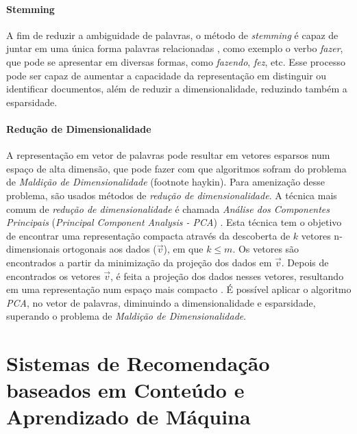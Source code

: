 \documentclass[normaltoc, espacoumemeio, pnumromarab,ruledheader]{abnt}
\begin{document}

    \subsubsection{Stemming}

    A fim de reduzir a ambiguidade de palavras, o método de \textit{stemming} é capaz de juntar em uma única forma palavras relacionadas \cite{Miner2012}, como exemplo o verbo \textit{fazer}, que pode se apresentar em diversas formas, como \textit{fazendo}, \textit{fez}, etc. Esse processo pode ser capaz de aumentar a capacidade da representação em distinguir ou identificar documentos, além de reduzir a dimensionalidade, reduzindo também a esparsidade.

    \subsubsection{Redução de Dimensionalidade}

    A representação em vetor de palavras pode resultar em vetores esparsos num espaço de alta dimensão, que pode fazer com que algoritmos sofram do problema de \textit{Maldição de Dimensionalidade} (footnote haykin).
    Para amenização desse problema, são usados métodos de \textit{redução de dimensionalidade}.
    A técnica mais comum de \textit{redução de dimensionalidade} é chamada \textit{Análise dos Componentes Principais} (\textit{Principal Component Analysis - PCA}) \cite{Murphy2012}.
    Esta técnica tem o objetivo de encontrar uma representação compacta através da descoberta de $k$ vetores n-dimensionais ortogonais aos dados ($\vec{v}$), em que $k \leq m$. Os vetores são encontrados a partir da minimização da projeção dos dados em $\vec{v}$.
    Depois de encontrados os vetores $\vec{v}$, é feita a projeção dos dados nesses vetores, resultando em uma representação num espaço mais compacto \cite{Kamber2011}.
    É possível aplicar o algoritmo \textit{PCA}, no vetor de palavras, diminuindo a dimensionalidade e esparsidade, superando o problema de \textit{Maldição de Dimensionalidade}.


\chapter{Sistemas de Recomendação baseados em Conteúdo e Aprendizado de Máquina}
\end{document}
